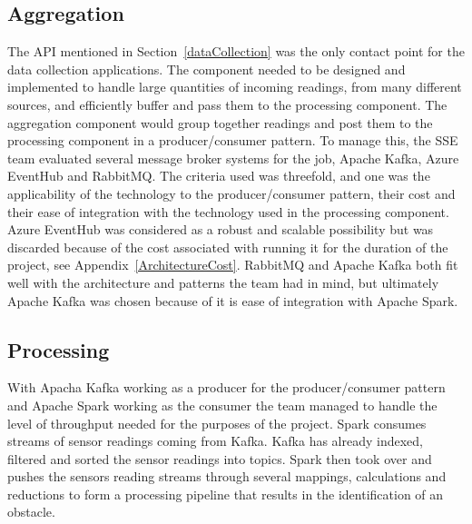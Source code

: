 \documentclass[prodmode,acmtosem]{acmsmall} %
\begin{document}
\subsection{Aggregation}  %
The API mentioned in Section~\ref{dataCollection} was the only contact point for the data collection applications. The component needed to be designed and implemented to handle large quantities of incoming readings, from many different sources, and efficiently buffer and pass them to the processing component. The aggregation component would group together readings and post them to the processing component in a producer/consumer pattern. To manage this, the SSE team evaluated several message broker systems for the job, Apache Kafka, Azure EventHub and RabbitMQ. The criteria used was threefold, and one was the applicability of the technology to the producer/consumer pattern, their cost and their ease of integration with the technology used in the processing component. Azure EventHub was considered as a robust and scalable possibility but was discarded because of the cost associated with running it for the duration of the project, see Appendix~\ref{ArchitectureCost}. RabbitMQ and Apache Kafka both fit well with the architecture and patterns the team had in mind, but ultimately Apache Kafka was chosen because of it is ease of integration with Apache Spark. 

\subsection{Processing}
With Apacha Kafka working as a producer for the producer/consumer pattern and Apache Spark working as the consumer the team managed to handle the level of throughput needed for the purposes of the project. Spark consumes streams of sensor readings coming from Kafka. Kafka has already indexed, filtered and sorted the sensor readings into topics. Spark then took over and pushes the sensors reading streams through several mappings, calculations and reductions to form a processing pipeline that results in the identification of an obstacle.
\end{document}

